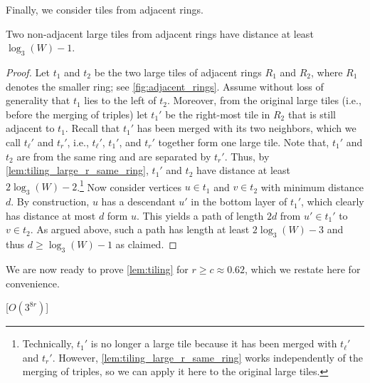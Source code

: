%
Finally, we consider tiles from adjacent rings.
%
\begin{lemma}
    \label{lem:tiling_large_r_adj_rings}
    Two non-adjacent large tiles from adjacent rings have distance at least $\log_3(W) - 1$.
\end{lemma}
\begin{proof}
    Let $t_1$ and $t_2$ be the two large tiles of adjacent rings $R_1$ and $R_2$, where $R_1$ denotes the smaller ring; see \cref{fig:adjacent_rings}.
    Assume without loss of generality that $t_1$ lies to the left of $t_2$.
    Moreover, from the original large tiles (i.e., before the merging of triples) let $t_1'$ be the right-most tile in $R_2$ that is still adjacent to $t_1$.
    Recall that $t_1'$ has been merged with its two neighbors, which we call $t_\ell'$ and $t_r'$, i.e., $t_\ell'$, $t_1'$, and $t_r'$ together form one large tile.
    Note that, $t_1'$ and $t_2$ are from the same ring and are separated by $t_r'$.
    Thus, by \cref{lem:tiling_large_r_same_ring}, $t_1'$ and $t_2$ have distance at least $2\log_3(W) - 2$.\footnote{Technically, $t_1'$ is no longer a large tile because it has been merged with $t_\ell'$ and $t_r'$.
      However, \cref{lem:tiling_large_r_same_ring} works independently of the merging of triples, so we can apply it here to the original large tiles.}
%
    Now consider vertices $u \in t_1$ and $v \in t_2$ with minimum distance $d$.
    By construction, $u$ has a descendant $u'$ in the bottom layer of $t_1'$, which clearly has distance at most $d$ form $u$.
    This yields a path of length $2d$ from $u' \in t_1'$ to $v \in t_2$.
    As argued above, such a path has length at least $2\log_3(W) -3$ and thus $d \ge \log_3(W) - 1$ as claimed.
\end{proof}
%
We are now ready to prove \cref{lem:tiling} for $ r \geq c \approx 0.62 $, which we restate here for convenience.
%
\begin{samepage}
\begin{lemma}\label{lem:tiling_large_radius}
    [$ O(3^{8r}) $]
\end{lemma}
\end{samepage}
%
